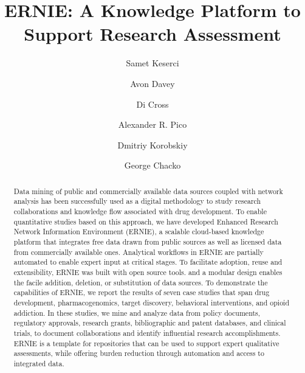 \documentclass[review]{elsarticle}
\begin{document}
\begin{frontmatter}

\title{ERNIE: A Knowledge Platform to Support Research Assessment} 

\author[nl]{Samet Keserci}
\author[nl]{Avon Davey}
\author[ca]{Di Cross}
\author[gi]{Alexander R. Pico}
\author[nl]{Dmitriy Korobskiy}
\author[nl]{George Chacko }



\address[nl]{NETE Labs, NET ESolutions Corporation, McLean, VA, USA}
\address[ca]{Research Data Science \& Evaluation, Clarivate Analytics, USA}
\address[gi]{Gladstone Institutes, San Francisco, CA, USA}

\raggedright

\begin{abstract}

Data mining of public and commercially available data sources coupled with network analysis has been successfully used as a digital methodology to study research collaborations and knowledge flow associated with drug development. To enable quantitative studies based on this approach, we have developed Enhanced Research Network Information Environment (ERNIE), a scalable cloud-based knowledge platform that integrates free data drawn from public sources as well as licensed data from commercially available ones. Analytical workflows in ERNIE are partially automated to enable expert input at critical stages. To facilitate adoption, reuse and extensibility, ERNIE was built with open source tools. and a modular design enables the facile addition, deletion, or substitution of data sources. To demonstrate the capabilities of ERNIE, we report the results of seven case studies that span drug development, pharmacogenomics, target discovery, behavioral interventions, and opioid addiction. In these studies, we mine and analyze data from policy documents, regulatory approvals, research grants, bibliographic and patent databases, and clinical trials, to document collaborations and identify influential research accomplishments. ERNIE is a template for repositories that can be used to support expert qualitative assessments, while offering burden reduction through automation and access to integrated data.

\end{abstract}


\end{frontmatter}       
\end{document}
